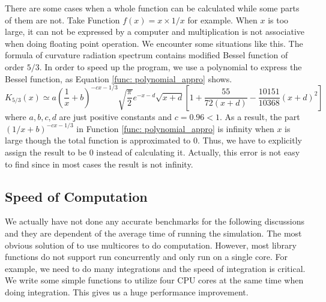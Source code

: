 \documentclass[12pt]{report}
\begin{document}
          There are some cases when a whole function can be calculated while some parts of them 
          are not. Take Function $f\left(x\right) = x\times1/x$ for example. When $x$ is too 
          large, it can not be expressed by a computer and multiplication is not associative when 
          doing floating point operation. We encounter some situations like this.
          The formula of curvature radiation spectrum contains modified Bessel function of order 
          $5/3$. In order to speed up the program, we use a polynomial to express the Bessel 
          function, as Equation \ref{func: polynomial_appro} shows. 
          \begin{equation}
            K_{5/3} \left(x\right) \simeq a \left(\frac{1}{x} + b\right)^{-cx - 1/3} \sqrt{\frac{\pi}{2}} e^{-x - d} \sqrt{x + d} %
            \left[1 + \frac{55}{72\left(x + d\right)} - \frac{10151}{10368}\left(x+d\right)^2\right] 
            \label{func: polynomial_appro}
          \end{equation}
          where $a,b,c,d$ are just positive constants and $c = 0.96 < 1$. As a result, 
          the part $(1/x + b)^{-cx - 1/3}$ in Function \ref{func: polynomial_appro} is infinity
          when $x$ is large though the total function is approximated to $0$. Thus, we have to 
          explicitly assign the result to be $0$ instead of calculating it. Actually, this error 
          is not easy to find since in most cases the result is not infinity. 
          
        \subsection{Speed of Computation}
          We actually have not done any accurate benchmarks for the following discussions and they are 
          dependent of the average time of running the simulation.
          The most obvious solution of to use multicores to do computation. However, most library functions 
          do not support run concurrently and only run on a single core. For example, we need to do many 
          integrations and the speed of integration is critical. We write some simple functions to 
          utilize four CPU cores at the same time when doing integration. 
          This gives us a huge performance improvement.
\end{document}

